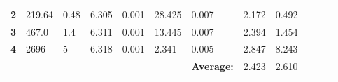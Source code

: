 \documentclass[12pt]{article}
\begin{document}
\begin{table}[H]
\begin{adjustwidth}{-1cm}{}
\begin{tabular}{|l|l|l|l|l|l|l|l|l|lll}
    \textbf{2}               & 219.64                                                                                  & 0.48                                                                                  & 6.305                                     & 0.001                                                                                & 28.425                                                                                & 0.007                                                                                  & 2.172                                                                                             & 0.492                                                                                  &  &  &  \\ \cline{1-9}
    \textbf{3}               & 467.0                                                                                     & 1.4                                                                                  & 6.311                                     & 0.001                                                                                & 13.445                                                                                & 0.007                                                                                   & 2.394                                                                                             & 1.454                                                                                   &  &  &  \\ \cline{1-9}
    \textbf{4}               & 2696                                                                                    & 5                                                                                   & 6.318                                     & 0.001                                                                                & 2.341                                                                                 & 0.005                                                                                  & 2.847                                                                                             & 8.243                                                                                   &  &  &  \\ \cline{1-9}
                             &                                                                                         &                                                                                          &                                           &                                                                                 &        & \multicolumn{1}{c|}{\textbf{Average:}}                                                & 2.423                                                                                     & 2.610                                                                                   &  &  &  \\ \cline{1-9}

\end{tabular}
\end{adjustwidth}
\end{table}
\end{document}
